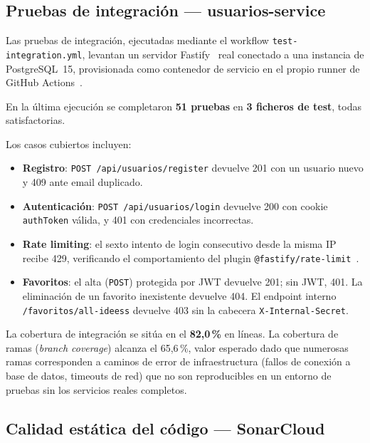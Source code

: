 \subsection{Pruebas de integración — usuarios-service}
\label{sec:pruebas-integracion}

Las pruebas de integración, ejecutadas mediante el workflow \texttt{test-integration.yml},
levantan un servidor Fastify~\cite{fastify} real conectado a una instancia de PostgreSQL~15,
provisionada como contenedor
de servicio en el propio runner de GitHub Actions~\cite{github_actions_services}.

En la última ejecución se completaron \textbf{51 pruebas} en \textbf{3 ficheros de test}, todas
satisfactorias.

Los casos cubiertos incluyen:

\begin{itemize}
  \item \textbf{Registro}: \texttt{POST /api/usuarios/register} devuelve 201 con un usuario
        nuevo y 409 ante email duplicado.
  \item \textbf{Autenticación}: \texttt{POST /api/usuarios/login} devuelve 200 con cookie
        \texttt{authToken} válida, y 401 con credenciales incorrectas.
  \item \textbf{Rate limiting}: el sexto intento de login consecutivo desde la misma IP
        recibe 429, verificando el comportamiento del plugin
        \texttt{@fastify/rate-limit}~\cite{fastify_ratelimit}.
  \item \textbf{Favoritos}: el alta (\texttt{POST}) protegida por JWT devuelve 201; sin JWT,
        401. La eliminación de un favorito inexistente devuelve 404. El endpoint interno
        \texttt{/favoritos/all-ideess} devuelve 403 sin la cabecera \texttt{X-Internal-Secret}.
\end{itemize}

La cobertura de integración se sitúa en el \textbf{82,0\,\%} en líneas. La cobertura de ramas
(\textit{branch coverage}) alcanza el 65,6\,\%, valor esperado dado que numerosas ramas
corresponden a caminos de error de infraestructura (fallos de conexión a base de datos,
timeouts de red) que no son reproducibles en un entorno de pruebas sin los servicios reales
completos.

\subsection{Calidad estática del código — SonarCloud}
\label{sec:calidad-estatica}

